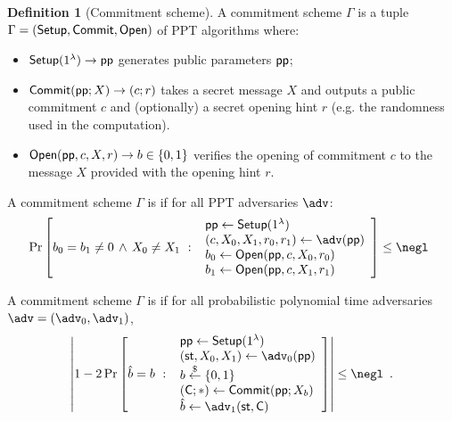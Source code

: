 \documentclass{article}
\theoremstyle{definition}
\newtheorem{definition}{Definition}
\newcommand{\ben}[1]{{\textcolor{green}{[Ben: #1]}}}
\newcommand{\alan}[1]{{\todo[color=blue!40!white]{Alan: #1}}}
\newcommand{\ben}[1]{}
\newcommand{\alan}[1]{}
\begin{document}
\begin{definition}[Commitment scheme]
A commitment scheme $\Gamma$ is a tuple $\Gamma = (\textsf{{Setup}}, \textsf{{Commit}}, \textsf{{Open}})$ of PPT algorithms where:
\begin{itemize}
    \item $\textsf{{Setup}}(1^\lambda) \rightarrow \textsf{pp}$ generates public parameters $\textsf{pp}$;
    \item $\textsf{{Commit}}(\textsf{pp}; X) \rightarrow (c; r)$ takes a secret message $X$ and outputs a public commitment $c$ and (optionally) a secret opening hint $r$ (e.g. the randomness used in the computation).
    \item $\textsf{{Open}}(\textsf{pp}, c, X, r) \rightarrow b \in \{0, 1\}$ verifies the opening of commitment $c$ to the message $X$ provided with the opening hint $r$. 
\end{itemize}

A commitment scheme $\Gamma$ is  if for all PPT adversaries $\adv$:
\[
    \Pr\left[
        b_0 = b_1 \neq 0 \, \wedge \, X_0 \neq X_1 \ : \
        \begin{array}{l}
             \params \gets \pro{Setup}(1^\lambda) \\
             (c, X_0, X_1, r_0, r_1) \gets \adv(\params) \\
             b_0 \gets \pro{Open}(\params, c, X_0, r_0) \\
             b_1 \gets \pro{Open}(\params, c, X_1, r_1) \\
        \end{array}
    \right] \leq \negl \enspace 
\]


A commitment scheme $\Gamma$ is  if for all probabilistic polynomial time adversaries $\adv=(\adv_0,\adv_1)$,
\[
    \left|
        1 - 2\Pr\left[
            \hat{b} = b \ : \
        \begin{array}{l}
             \params \gets \pro{Setup}(1^\lambda) \\
             (\state, X_0, X_1) \gets \adv_0(\params) \\
             b \sample \{0,1\} \\
             (\gr{C}; *) \gets \pro{Commit}(\params; X_b) \\
             \hat{b} \gets \adv_1(\state, \gr{C})
        \end{array}
        \right]
    \right| \leq \negl \enspace .
\]
\end{definition}
\end{document}
